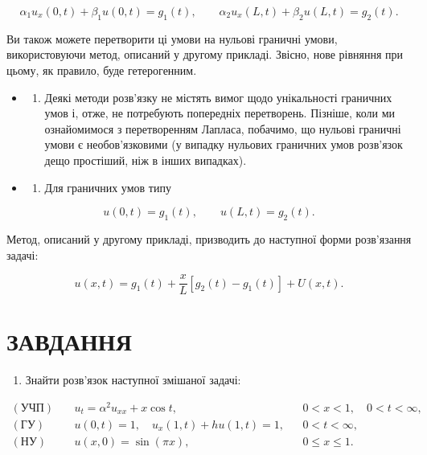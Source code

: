 \documentclass[
  ukrainian,
]{article}
\providecommand{\tightlist}{%
  \setlength{\itemsep}{0pt}\setlength{\parskip}{0pt}}
\begin{document}
\[
\alpha_1 u_x(0,t) + \beta_1 u(0,t) = g_1(t), \qquad \alpha_2 u_x(L,t) + \beta_2 u(L,t) = g_2(t).
\]

Ви також можете перетворити ці умови на нульові граничні умови,
використовуючи метод, описаний у другому прикладі. Звісно, нове рівняння
при цьому, як правило, буде гетерогенним.

\begin{itemize}
\tightlist
\item
  \begin{enumerate}
  \def\labelenumi{\arabic{enumi}.}
  \setcounter{enumi}{2}
  \tightlist
  \item
    Деякі методи розв'язку не містять вимог щодо унікальності граничних
    умов і, отже, не потребують попередніх перетворень. Пізніше, коли ми
    ознайомимося з перетворенням Лапласа, побачимо, що нульові граничні
    умови є необов'язковими (у випадку нульових граничних умов розв'язок
    дещо простіший, ніж в інших випадках).
  \end{enumerate}
\item
  \begin{enumerate}
  \def\labelenumi{\arabic{enumi}.}
  \setcounter{enumi}{3}
  \tightlist
  \item
    Для граничних умов типу
  \end{enumerate}
\end{itemize}

\[
u(0, t)=g_1(t), \qquad u(L, t)=g_2(t).
\]

Метод, описаний у другому прикладі, призводить до наступної форми
розв'язання задачі:

\[
u(x, t)=g_1(t)+\frac{x}{L}\left[g_2(t)-g_1(t)\right]+U(x, t).
\]

\section{ЗАВДАННЯ}\label{ux437ux430ux432ux434ux430ux43dux43dux44f-5}

\begin{enumerate}
\def\labelenumi{\arabic{enumi}.}
\tightlist
\item
  Знайти розв'язок наступної змішаної задачі:
\end{enumerate}

\[
\begin{aligned}
(\text{УЧП})\quad & u_t = \alpha^2 u_{xx} + x\cos t, && 0 < x < 1,\quad 0 < t < \infty, \\
(\text{ГУ})\quad & u(0,t) = 1,\quad u_x(1,t) + hu(1,t) = 1, && 0 < t < \infty, \\
(\text{НУ})\quad & u(x,0) = \sin(\pi x), && 0 \leqslant x \leqslant 1.
\end{aligned}
\]
\end{document}
